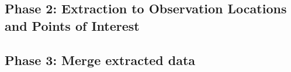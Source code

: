 \documentclass[letterpaper,12pt]{article}
\begin{document}












































\pagebreak
\subsection{Phase 2: Extraction to Observation Locations and Points of Interest}





\pagebreak
\subsection{Phase 3: Merge extracted data}
\end{document}

